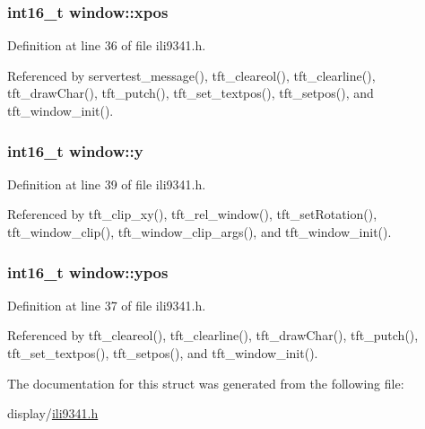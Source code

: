\subsubsection[{\texorpdfstring{xpos}{xpos}}]{\setlength{\rightskip}{0pt plus 5cm}int16\+\_\+t window\+::xpos}\hypertarget{structwindow_a890a7dba31e7328500f4e5e41e51aab7}{}\label{structwindow_a890a7dba31e7328500f4e5e41e51aab7}


Definition at line 36 of file ili9341.\+h.



Referenced by servertest\+\_\+message(), tft\+\_\+cleareol(), tft\+\_\+clearline(), tft\+\_\+draw\+Char(), tft\+\_\+putch(), tft\+\_\+set\+\_\+textpos(), tft\+\_\+setpos(), and tft\+\_\+window\+\_\+init().

\subsubsection[{\texorpdfstring{y}{y}}]{\setlength{\rightskip}{0pt plus 5cm}int16\+\_\+t window\+::y}\hypertarget{structwindow_a95c7023fc42e79ab42c291b90a490776}{}\label{structwindow_a95c7023fc42e79ab42c291b90a490776}


Definition at line 39 of file ili9341.\+h.



Referenced by tft\+\_\+clip\+\_\+xy(), tft\+\_\+rel\+\_\+window(), tft\+\_\+set\+Rotation(), tft\+\_\+window\+\_\+clip(), tft\+\_\+window\+\_\+clip\+\_\+args(), and tft\+\_\+window\+\_\+init().

\subsubsection[{\texorpdfstring{ypos}{ypos}}]{\setlength{\rightskip}{0pt plus 5cm}int16\+\_\+t window\+::ypos}\hypertarget{structwindow_a64bdec4f0ee274a96d696b16de783746}{}\label{structwindow_a64bdec4f0ee274a96d696b16de783746}


Definition at line 37 of file ili9341.\+h.



Referenced by tft\+\_\+cleareol(), tft\+\_\+clearline(), tft\+\_\+draw\+Char(), tft\+\_\+putch(), tft\+\_\+set\+\_\+textpos(), tft\+\_\+setpos(), and tft\+\_\+window\+\_\+init().



The documentation for this struct was generated from the following file\+:\begin{DoxyCompactItemize}
\item 
display/\hyperlink{ili9341_8h}{ili9341.\+h}\end{DoxyCompactItemize}
